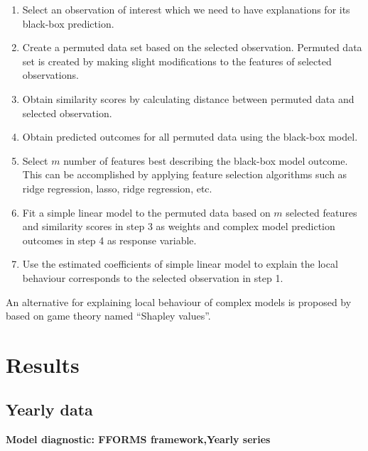 \documentclass[11pt,a4paper,]{article}
\providecommand{\tightlist}{%
  \setlength{\itemsep}{0pt}\setlength{\parskip}{0pt}}
\theoremstyle{definition}
\theoremstyle{definition}
\theoremstyle{definition}
\theoremstyle{remark}
\begin{document}
\begin{enumerate}
\def\labelenumi{\arabic{enumi}.}
\tightlist
\item
  Select an observation of interest which we need to have explanations
  for its black-box prediction.
\item
  Create a permuted data set based on the selected observation. Permuted
  data set is created by making slight modifications to the features of
  selected observations.
\item
  Obtain similarity scores by calculating distance between permuted data
  and selected observation.
\item
  Obtain predicted outcomes for all permuted data using the black-box
  model.
\item
  Select \(m\) number of features best describing the black-box model
  outcome. This can be accomplished by applying feature selection
  algorithms such as ridge regression, lasso, ridge regression, etc.
\item
  Fit a simple linear model to the permuted data based on \(m\) selected
  features and similarity scores in step 3 as weights and complex model
  prediction outcomes in step 4 as response variable.
\item
  Use the estimated coefficients of simple linear model to explain the
  local behaviour corresponds to the selected observation in step 1.
\end{enumerate}

An alternative for explaining local behaviour of complex models is
proposed by \textcite{lundberg2017unified} based on game theory named
``Shapley values''.

\newpage

\section{Results}\label{results}

\subsection{Yearly data}\label{yearly-data}

\textbf{Model diagnostic: FFORMS framework,Yearly series}
\end{document}

